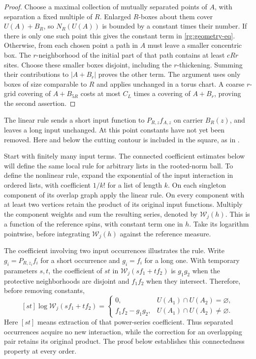 \begin{proof}
Choose a maximal collection of mutually separated points of $A$, with
separation a fixed multiple of $R$.  Enlarged $R$-boxes about them cover
$U(A)+B_R$, so $N_R(U(A))$ is bounded by a constant times their number.
If there is only one such point this gives the constant term in
\eqref{rg:geometry-eq}.  Otherwise, from each chosen point a path in $A$
must leave a smaller concentric box.  The $r$-neighborhood of the initial
part of that path contains at least $cRr$ sites.  Choose these smaller
boxes disjoint, including the $r$-thickening.  Summing their contributions
to $|A+B_r|$ proves the other term.  The argument uses only boxes of size
comparable to $R$ and applies unchanged in a torus chart.  A coarse
$r$-grid covering of $A+B_{5R}$ costs at most $C_L$ times a covering of
$A+B_r$, proving the second assertion.
\end{proof}

The linear rule sends a short input function to $P_{R,z}f_{A,z}$ on
carrier $B_R(z)$, and leaves a long input unchanged.  At this point
constants have not yet been removed.  Here and below the cutting contour
is included in the square, as in .

Start with finitely many input terms.  The connected coefficient
estimates below will define the same local rule for arbitrary lists
in the rooted-norm ball.  To define the nonlinear rule, expand the
exponential of the input interaction
in ordered lists, with coefficient $1/k!$ for a list of
length $k$.  On each singleton component of its overlap graph apply the
linear rule.  On every component with at least two vertices retain the
product of its original input functions.  Multiply the component
weights and sum the resulting series, denoted by $\mathcal W_j(h)$.
This is a function of the reference spins, with constant term one in
$h$.  Take its logarithm pointwise, before integrating
$\mathcal W_j(h)$ against the reference measure.

The coefficient involving two input occurrences illustrates the rule.
Write $g_i=P_{R,z_i}f_i$ for a short occurrence and $g_i=f_i$ for a
long one.  With temporary parameters $s,t$, the coefficient of $st$ in
$\mathcal W_j(sf_1+tf_2)$ is $g_1g_2$ when the protective neighborhoods
are disjoint and $f_1f_2$ when they intersect.  Therefore, before removing
constants,
\begin{equation}\label{rg:pair-coefficient}
 [st]\log\mathcal W_j(sf_1+tf_2)
 =\begin{cases}
   0,&U(A_1)\cap U(A_2)=\varnothing,\\
   f_1f_2-g_1g_2,&U(A_1)\cap U(A_2)\ne\varnothing.
  \end{cases}
\end{equation}
Here $[st]$ means extraction of that power-series coefficient.  Thus
separated occurrences acquire no new interaction, while the correction
for an overlapping pair retains its original product.  The proof below
establishes this connectedness property at every order.

